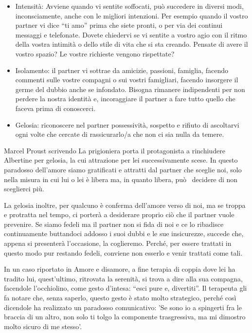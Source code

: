 \documentclass[12pt]{book} %
\begin{document}
\begin{itemize}
\item Intensità: Avviene quando vi sentite soffocati, può succedere in diversi modi, inconsciamente, anche con le
migliori intenzioni. Per esempio quando il vostro partner vi dice “ti amo” prima che siete pronti, o per via dei
continui messaggi e telefonate. Dovete chiedervi se vi sentite a vostro agio con il ritmo della vostra intimità o dello
stile di vita che si sta creando. Pensate di avere il vostro spazio? Le vostre richieste vengono rispettate?
\item Isolamento: il partner vi sottrae da amicizie, passioni, famiglia, facendo commenti sulle vostre compagni o sui
vostri famigliari, facendo insorgere il germe del dubbio anche se infondato. Bisogna rimanere indipendenti per non
perdere la nostra identità e, incoraggiare il partner a fare tutto quello che faceva prima di conoscerci. 
\item Gelosia: riconoscere nel partner possessività, sospetto e rifiuto di ascoltarvi ogni volte che cercate di
rassicurarlo/a che non ci sia nulla da temere.
\end{itemize}
\begin{mdframed}[linewidth=1pt]
Marcel Proust scrivendo La prigioniera porta il protagonista a rinchiudere Albertine per gelosia, la cui attrazione per
lei successivamente scese. In questo paradosso dell'amore siamo gratificati e attratti dal partner
che sceglie noi, solo nella misura in cui lui o lei è libera ma, in quanto libera, può \ decidere di non sceglierci
più.

{
La gelosia inoltre, per qualcuno è conferma dell'amore verso di noi, ma se troppa e protratta nel
tempo, ci porterà a desiderare proprio ciò che il partner vuole prevenire. Se siamo fedeli ma il partner non si fida di
noi e ce lo ribadisce continuamente buttandoci addosso i suoi dubbi e le sue insicurezze, succede che, appena si
presenterà l'occasione, la coglieremo. Perché, per essere trattati in questo modo pur restando
fedeli, conviene non esserlo e venir trattati come tali.}

{
In un caso riportato in Amore e disamore, a fine terapia di coppia dove
lei ha tradito lui, quest'ultimo, ritrovata la serenità, si trova a dire alla sua compagna,
facendole l'occhiolino, come gesto d'intesa: “esci pure e, divertiti”. Il
terapeuta gli fa notare che, senza saperlo, questo gesto è stato molto strategico, perché così dicendole ha realizzato
un paradosso comunicativo: 'Se sono io a spingerti fra le braccia di un altro, non solo ti tolgo
la componente trasgressiva, ma mi dimostro molto sicuro di me stesso'.}
\end{mdframed}
\end{document}
